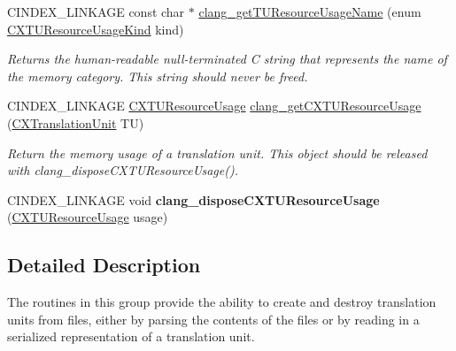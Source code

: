 \begin{DoxyCompactItemize}
\mbox{\label{group__CINDEX__TRANSLATION__UNIT_gabfa8cf56068a27a4dc1cc4caa1f178b1}} 
C\+I\+N\+D\+E\+X\+\_\+\+L\+I\+N\+K\+A\+GE const char $\ast$ \mbox{\hyperlink{group__CINDEX__TRANSLATION__UNIT_gabfa8cf56068a27a4dc1cc4caa1f178b1}{clang\+\_\+get\+T\+U\+Resource\+Usage\+Name}} (enum \mbox{\hyperlink{group__CINDEX__TRANSLATION__UNIT_ga13810240df7c205de04daac58f956396}{C\+X\+T\+U\+Resource\+Usage\+Kind}} kind)
\begin{DoxyCompactList}\small\item\em Returns the human-\/readable null-\/terminated C string that represents the name of the memory category. This string should never be freed. \end{DoxyCompactList}\item 
\mbox{\label{group__CINDEX__TRANSLATION__UNIT_gaacd1a1e9d83aaeec6b800e701b3a53f5}} 
C\+I\+N\+D\+E\+X\+\_\+\+L\+I\+N\+K\+A\+GE \mbox{\hyperlink{structCXTUResourceUsage}{C\+X\+T\+U\+Resource\+Usage}} \mbox{\hyperlink{group__CINDEX__TRANSLATION__UNIT_gaacd1a1e9d83aaeec6b800e701b3a53f5}{clang\+\_\+get\+C\+X\+T\+U\+Resource\+Usage}} (\mbox{\hyperlink{group__CINDEX_gacdb7815736ca709ce9a5e1ec2b7e16ac}{C\+X\+Translation\+Unit}} TU)
\begin{DoxyCompactList}\small\item\em Return the memory usage of a translation unit. This object should be released with clang\+\_\+dispose\+C\+X\+T\+U\+Resource\+Usage(). \end{DoxyCompactList}\item 
\mbox{\label{group__CINDEX__TRANSLATION__UNIT_gad80475303ab1270d878319ae6d85ef26}} 
C\+I\+N\+D\+E\+X\+\_\+\+L\+I\+N\+K\+A\+GE void {\bfseries clang\+\_\+dispose\+C\+X\+T\+U\+Resource\+Usage} (\mbox{\hyperlink{structCXTUResourceUsage}{C\+X\+T\+U\+Resource\+Usage}} usage)
\end{DoxyCompactItemize}


\subsection{Detailed Description}
The routines in this group provide the ability to create and destroy translation units from files, either by parsing the contents of the files or by reading in a serialized representation of a translation unit. 

